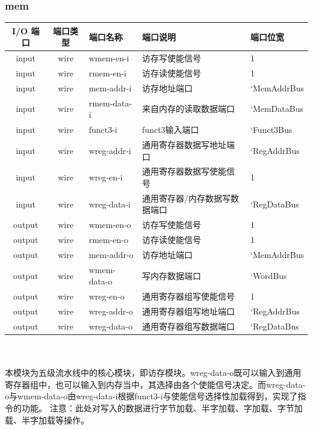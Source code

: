 \documentclass[lang=cn,11pt,a4paper]{elegantpaper}
\begin{document}
\subsubsection{mem}
\begin{tabular}{cclll}
	\toprule
	I/O 端口 & 端口类型 &端口名称&端口说明 &端口位宽\\
	\midrule
	input &wire& wmem-en-i & 访存写使能信号 & 1 \\
	input &wire& rmem-en-i & 访存读使能信号 & 1 \\
	input &wire& mem-addr-i &  访存地址端口   & `MemAddrBus   \\
	input &wire& rmem-data-i &  来自内存的读取数据端口   & `MemDataBus   \\
	input &wire& funct3-i & funct3输入端口    & `Funct3Bus   \\
	input &wire& wreg-addr-i & 通用寄存器数据写地址端口 & `RegAddrBus \\
	input &wire& wreg-en-i & 通用寄存器数据写使能信号 & 1  \\
	input &wire& wreg-data-i & 通用寄存器/内存数据写数据端口 & `RegDataBus  \\
	
	output &wire& wmem-en-o & 访存写使能信号 & 1 \\
	output &wire& rmem-en-o & 访存读使能信号 & 1 \\
	output &wire& mem-addr-o &  访存地址端口   & `MemAddrBus   \\
	output &wire& wmem-data-o &  写内存数据端口   & `WordBus   \\	
	output &wire& wreg-en-o & 通用寄存器组写使能信号    & 1   \\
	output &wire& wreg-addr-o & 通用寄存器组写地址端口    & `RegAddrBus  \\
	output &wire& wreg-data-o & 通用寄存器组写数据端口    & `RegDataBus  \\
	\bottomrule
\end{tabular}\\
\\
本模块为五级流水线中的核心模块，即访存模块。wreg-data-o既可以输入到通用寄存器组中，也可以输入到内存当中，其选择由各个使能信号决定。而wreg-data-o与wmem-data-o由wreg-data-i根据funct3-i与使能信号选择性加载得到，实现了指令的功能。
注意：此处对写入的数据进行字节加载、半字加载、字加载、字节加载、半字加载等操作。
\end{document}
